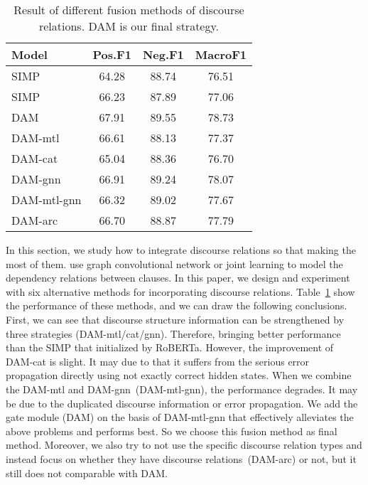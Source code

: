\documentclass[11pt]{article}
\begin{document}
\begin{table}
\centering
\begin{tabular}{lccc}
\toprule
\textbf{Model} & \textbf{Pos.F1}    & \textbf{Neg.F1}   & \textbf{MacroF1}  \\
\midrule
SIMP  & 64.28     & 88.74    & 76.51     \\
SIMP & 66.23     & 87.89    & 77.06     \\
\midrule
DAM          & 67.91     & 89.55    & 78.73     \\
DAM-mtl      & 66.61     & 88.13    & 77.37     \\
DAM-cat      & 65.04     & 88.36    & 76.70     \\
DAM-gnn      & 66.91     & 89.24    & 78.07     \\
DAM-mtl-gnn  & 66.32     & 89.02    & 77.67     \\
DAM-arc      & 66.70     & 88.87    & 77.79     \\
\bottomrule
\end{tabular}
\caption{\label{tab5}Result of different fusion methods of discourse relations. DAM is our final strategy.}
\end{table}


In this section, we study how to integrate discourse relations so that making the most of them.
\citet{chen2020end,ding2020ecpe} use graph convolutional network or joint learning to model the dependency relations between clauses.
In this paper, we design and experiment with six alternative methods for incorporating discourse relations.
Table~\ref{tab5} show the performance of these methods, and we can draw the following conclusions.
First, we can see that discourse structure information can be strengthened by three strategies (DAM-mtl/cat/gnn).
Therefore, bringing better performance than the SIMP that initialized by RoBERTa.
However, the improvement of DAM-cat is slight.
It may due to that it suffers from the serious error propagation directly using not exactly correct hidden states.
When we combine the DAM-mtl and DAM-gnn~(DAM-mtl-gnn), the performance degrades.
It may be due to the duplicated discourse information or error propagation.
We add the gate module (DAM) on the basis of DAM-mtl-gnn that  effectively alleviates the above problems and performs best.
So we choose this fusion method as final method.
Moreover, we also try to not use the specific discourse relation types and instead focus on whether they have discourse relations~(DAM-arc) or not, but it still does not comparable with DAM.
\end{document}
